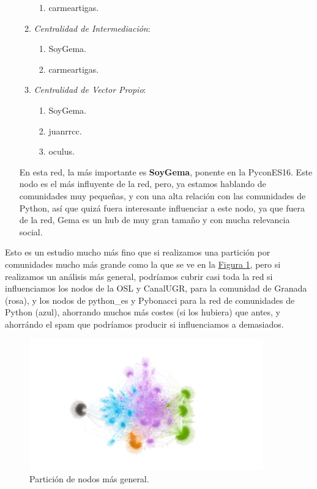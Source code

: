 \documentclass[paper=a4, fontsize=11pt]{article} %
\numberwithin{equation}{section} %
\numberwithin{figure}{section} %
\numberwithin{table}{section} %
\begin{document}
\begin{enumerate}[$\bullet$]
\begin{enumerate}[---]
\begin{enumerate}
      \item carmeartigas.
    \end{enumerate}
    \item \textit{Centralidad de Intermediación}:
    \begin{enumerate}
      \item SoyGema.
      \item carmeartigas.
    \end{enumerate}
    \item \textit{Centralidad de Vector Propio}:
    \begin{enumerate}
      \item SoyGema.
      \item juanrrcc.
      \item oculus.
    \end{enumerate}
  \end{enumerate}
  En esta red, la más importante es \textbf{SoyGema}, ponente en la PyconES16. Este nodo es el más influyente de la red, pero, ya estamos hablando de comunidades muy pequeñas, y con una alta relación con las comunidades de Python, así que quizá fuera interesante influenciar a este nodo, ya que fuera de la red, Gema es un hub de muy gran tamaño y con mucha relevancia social.
\end{enumerate}

Esto es un estudio mucho más fino que si realizamos una partición por comunidades mucho más grande como la que se ve en la \hyperref[im11]{Figura \ref*{im11}}, pero si realizamos un análisis más general, podríamos cubrir casi toda la red si influenciamos los nodos de la OSL y CanalUGR, para la comunidad de Granada (rosa), y los nodos de python\_es y Pybonacci para la red de comunidades de Python (azul), ahorrando muchos más costes (si los hubiera) que antes, y ahorrándo el spam que podríamos producir si influenciamos a demasiados.

\begin{figure}[H]
  \centering
  \includegraphics[width=0.9\textwidth]{img/comBig}
  \caption{Partición de nodos más general.}
  \label{im11}
\end{figure}
\end{document}

